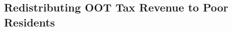 \documentclass[letterpaper,12pt,dvipsnames,usenames]{article}
\theoremstyle{definition}
\begin{document}
\begin{spacing}{1.25}
{%
%
%


\subsection{Redistributing OOT Tax Revenue to Poor Residents}

}
\end{spacing}
\end{document}

